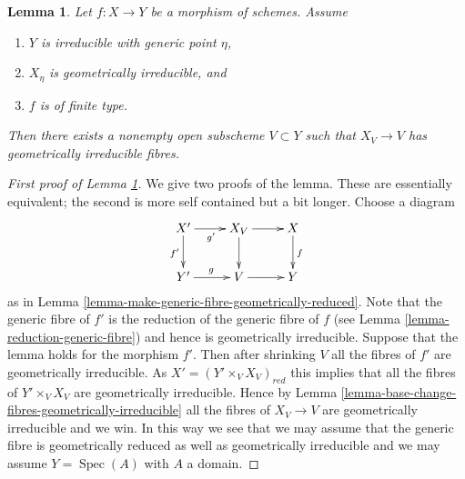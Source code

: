 \documentclass[10pt,a4paper]{amsart}
\theoremstyle{plain}
\newtheorem{lemma}[subsection]{Lemma}
\theoremstyle{definition}
\theoremstyle{remark}
\numberwithin{equation}{subsection}
\def\Spec{\mathop{\mathrm{Spec}}}
\begin{document}
\begin{lemma}
\label{lemma-geom-irreducible-generic-fibre}
Let $f : X \to Y$ be a morphism of schemes.
Assume
\begin{enumerate}
\item $Y$ is irreducible with generic point $\eta$,
\item $X_\eta$ is geometrically irreducible, and
\item $f$ is of finite type.
\end{enumerate}
Then there exists a nonempty open subscheme $V \subset Y$
such that $X_V \to V$ has geometrically irreducible fibres.
\end{lemma}

\begin{proof}[First proof of Lemma \ref{lemma-geom-irreducible-generic-fibre}]
We give two proofs of the lemma. These are essentially equivalent;
the second is more self contained but a bit longer.
Choose a diagram
$$
\xymatrix{
X' \ar[d]_{f'} \ar[r]_{g'} & X_V \ar[r] \ar[d] & X \ar[d]^f \\
Y' \ar[r]^g & V \ar[r] & Y
}
$$
as in
Lemma \ref{lemma-make-generic-fibre-geometrically-reduced}.
Note that the generic fibre of $f'$ is the reduction of the
generic fibre of $f$ (see
Lemma \ref{lemma-reduction-generic-fibre})
and hence is geometrically irreducible.
Suppose that the lemma holds for the morphism $f'$. Then after shrinking
$V$ all the fibres of $f'$ are geometrically irreducible.
As $X' = (Y' \times_V X_V)_{red}$ this implies that all the fibres
of $Y' \times_V X_V$ are geometrically irreducible. Hence by
Lemma \ref{lemma-base-change-fibres-geometrically-irreducible}
all the fibres of $X_V \to V$ are geometrically irreducible and
we win. In this way we see that we may assume that the generic
fibre is geometrically reduced as well as geometrically irreducible
and we may assume $Y = \Spec(A)$ with $A$ a domain.


\end{proof}
\end{document}
